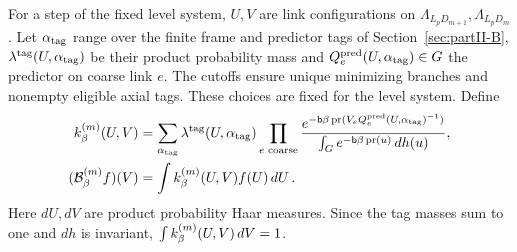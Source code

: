 \begin{definition}\label{def:block-spin}
For a step of the fixed level system, $U,V$ are link configurations on $\Lambda_{L_pD_{m+1}},\Lambda_{L_pD_m}$. Let $\alpha_{\rm tag}$ range over the finite frame and predictor tags of Section~\ref{sec:partII-B}, $\lambda^{\rm tag}(U,\alpha_{\rm tag})$ be their product probability mass and $Q_e^{\rm pred}(U,\alpha_{\rm tag})\in G$ the predictor on coarse link $e$. The cutoffs ensure unique minimizing branches and nonempty eligible axial tags. These choices are fixed for the level system. Define
\begin{align}\label{eq:block-kernel}
k^{(m)}_\beta(U,V)&=\sum_{\alpha_{\rm tag}}\lambda^{\rm tag}(U,\alpha_{\rm tag})\prod_{e\text{ coarse}}\frac{e^{-\mathsf{b}\beta\operatorname{pr}(V_eQ_e^{\rm pred}(U,\alpha_{\rm tag})^{-1})}}{\int_Ge^{-\mathsf{b}\beta\operatorname{pr}(u)}\,dh(u)},\\
(\mathcal{B}^{(m)}_\beta f)(V)&=\int k^{(m)}_\beta(U,V)f(U)\,dU\,.
\end{align}
Here $dU,dV$ are product probability Haar measures. Since the tag masses sum to one and $dh$ is invariant, $\int k^{(m)}_\beta(U,V)\,dV=1$.
\end{definition}

